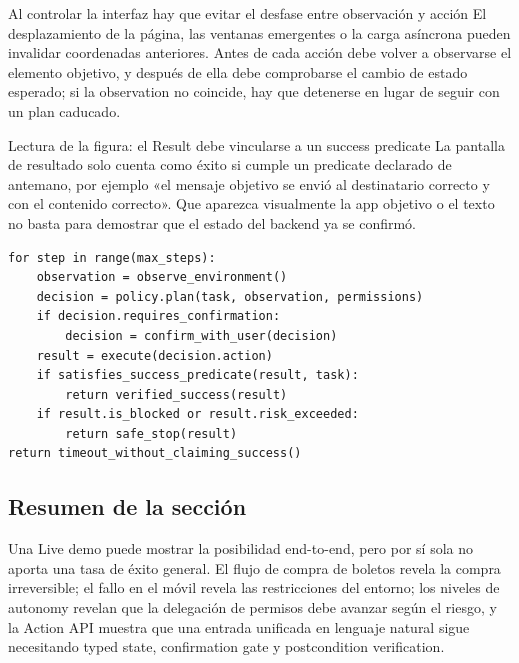 
\begin{warningbox}{Al controlar la interfaz hay que evitar el desfase entre observación y acción}
El desplazamiento de la página, las ventanas emergentes o la carga asíncrona pueden invalidar coordenadas anteriores. Antes de cada acción debe volver a observarse el elemento objetivo, y después de ella debe comprobarse el cambio de estado esperado; si la observation no coincide, hay que detenerse en lugar de seguir con un plan caducado.
\end{warningbox}


\begin{knowledgebox}{Lectura de la figura: el Result debe vincularse a un success predicate}
La pantalla de resultado solo cuenta como éxito si cumple un predicate declarado de antemano, por ejemplo «el mensaje objetivo se envió al destinatario correcto y con el contenido correcto». Que aparezca visualmente la app objetivo o el texto no basta para demostrar que el estado del backend ya se confirmó.
\end{knowledgebox}

\begin{lstlisting}[caption={Controlador observe-act-verify de la Action API}]
for step in range(max_steps):
    observation = observe_environment()
    decision = policy.plan(task, observation, permissions)
    if decision.requires_confirmation:
        decision = confirm_with_user(decision)
    result = execute(decision.action)
    if satisfies_success_predicate(result, task):
        return verified_success(result)
    if result.is_blocked or result.risk_exceeded:
        return safe_stop(result)
return timeout_without_claiming_success()
\end{lstlisting}

\subsection{Resumen de la sección}

Una Live demo puede mostrar la posibilidad end-to-end, pero por sí sola no aporta una tasa de éxito general. El flujo de compra de boletos revela la compra irreversible; el fallo en el móvil revela las restricciones del entorno; los niveles de autonomy revelan que la delegación de permisos debe avanzar según el riesgo, y la Action API muestra que una entrada unificada en lenguaje natural sigue necesitando typed state, confirmation gate y postcondition verification.
